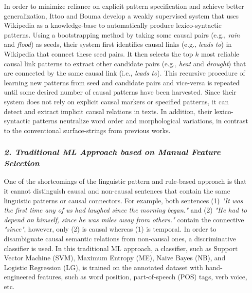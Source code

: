 In order to minimize reliance on explicit pattern specification and achieve better generalization, Ittoo and Bouma \cite{IttooBouma11} develop a weakly supervised system that uses Wikipedia as a knowledge-base to automatically produce lexico-syntactic patterns. Using a bootstrapping method by taking some causal pairs (e.g., \emph{rain} and \emph{flood}) as seeds, their system first identifies causal links (e.g., \emph{leads to}) in Wikipedia that connect these seed pairs. It then selects the top $k$ most reliable causal link patterns to extract other candidate pairs (e.g., \emph{heat} and \emph{drought}) that are connected by the same causal link (i.e., \emph{leads to}). This recursive procedure of learning new patterns from seed and candidate pairs and vice-versa is repeated until some desired number of causal patterns have been harvested. Since their system does not rely on explicit causal markers or specified patterns, it can detect and extract implicit causal relations in texts. In addition, their lexico-syntactic patterns neutralize word order and morphological variations, in contrast to the conventional surface-strings from previous works.


\subsubsection {\emph{2. Traditional ML Approach based on Manual Feature Selection}}

One of the shortcomings of the linguistic pattern and rule-based approach is that it cannot distinguish causal and non-causal sentences that contain the same linguistic patterns or causal connectors. For example, both sentences (1) \emph{"It was the first time any of us had laughed since the morning began."} and (2) \emph{"He had to depend on himself, since he was miles away from others."} contain the connective \emph{"since"}, however, only (2) is causal whereas (1) is temporal. In order to disambiguate causal semantic relations from non-causal ones, a discriminative classifier is used. In this traditional ML approach, a classifier, such as Support Vector Machine (SVM), Maximum Entropy (ME), Naive Bayes (NB), and Logistic Regression (LG), is trained on the annotated dataset with hand-engineered features, such as word position, part-of-speech (POS) tags, verb voice, etc.

